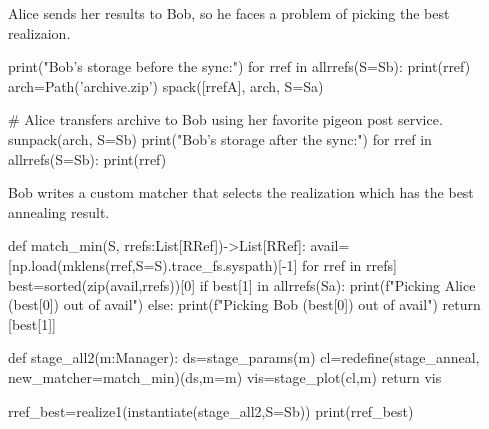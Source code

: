 Alice sends her results to Bob, so he faces a problem of picking the best
realizaion.

\begin{pythontexcode}
print("Bob's storage before the sync:")
for rref in allrrefs(S=Sb):
  print(rref)
arch=Path('archive.zip')
spack([rrefA], arch, S=Sa)

# Alice transfers archive to Bob using her favorite pigeon post service.
sunpack(arch, S=Sb)
print("Bob's storage after the sync:")
for rref in allrrefs(S=Sb):
  print(rref)
\end{pythontexcode}

\mystdout


Bob writes a custom matcher that selects the realization which has the best
annealing result.

\begin{pythontexcode}
def match_min(S, rrefs:List[RRef])->List[RRef]:
  avail=[np.load(mklens(rref,S=S).trace_fs.syspath)[-1] for rref in rrefs]
  best=sorted(zip(avail,rrefs))[0]
  if best[1] in allrrefs(Sa):
    print(f"Picking Alice ({best[0]}) out of {avail}")
  else:
    print(f"Picking Bob ({best[0]}) out of {avail}")
  return [best[1]]

def stage_all2(m:Manager):
  ds=stage_params(m)
  cl=redefine(stage_anneal, new_matcher=match_min)(ds,m=m)
  vis=stage_plot(cl,m)
  return vis

rref_best=realize1(instantiate(stage_all2,S=Sb))
print(rref_best)
\end{pythontexcode}

\mystdout
